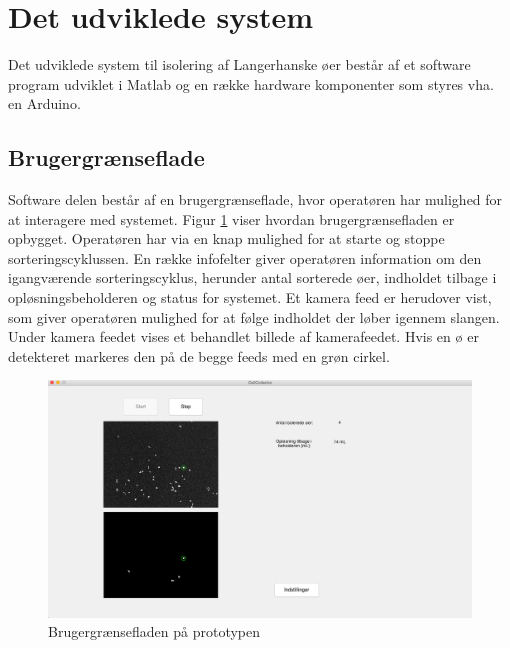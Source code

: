 \section{Det udviklede system}
Det udviklede system til isolering af Langerhanske øer består af et software program udviklet i Matlab og en række hardware komponenter som styres vha. en Arduino.


 
\subsection{Brugergrænseflade}
Software delen består af en brugergrænseflade, hvor operatøren har mulighed for at interagere med systemet. Figur \ref{fig:finalgui} viser hvordan brugergrænsefladen er opbygget. Operatøren har via en knap mulighed for at starte og stoppe sorteringscyklussen. En række infofelter giver operatøren information om den igangværende sorteringscyklus, herunder antal sorterede øer, indholdet tilbage i opløsningsbeholderen og status for systemet. Et kamera feed er herudover vist, som giver operatøren mulighed for at følge indholdet der løber igennem slangen. Under kamera feedet vises et behandlet billede af kamerafeedet. Hvis en ø er detekteret markeres den på de begge feeds med en grøn cirkel.

 \begin{figure}[H]
	\centering
	\includegraphics[width=1\textwidth]{billeder/gui_main.png}
	\caption{Brugergrænsefladen på prototypen}
	\label{fig:finalgui}
\end{figure}